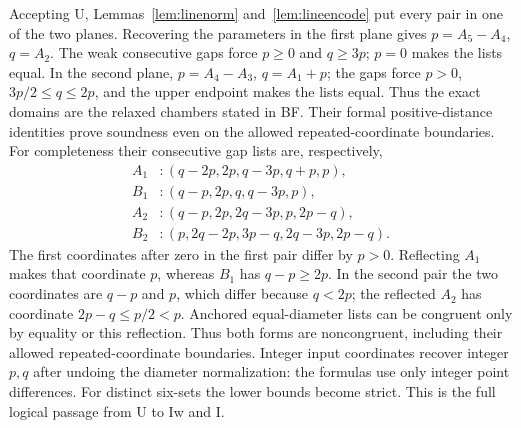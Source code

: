 \documentclass[11pt]{article}
\theoremstyle{remark}
\begin{document}
Accepting U, Lemmas~\ref{lem:linenorm} and~\ref{lem:lineencode} put every
pair in one of the two planes. Recovering the parameters in the first
plane gives $p=A_5-A_4$, $q=A_2$. The weak consecutive gaps force
$p\ge0$ and $q\ge3p$; $p=0$ makes the lists equal. In the second plane,
$p=A_4-A_3$, $q=A_1+p$; the gaps force $p>0$,
$3p/2\le q\le2p$, and the upper endpoint makes the lists equal.
Thus the exact domains are the relaxed chambers stated in BF. Their
formal positive-distance identities prove soundness even on the allowed
repeated-coordinate boundaries. For completeness their consecutive gap
lists are, respectively,
\begin{align*}
 A_1 &: (q-2p,2p,q-3p,q+p,p),\\
 B_1 &: (q-p,2p,q,q-3p,p),\\
 A_2 &: (q-p,2p,2q-3p,p,2p-q),\\
 B_2 &: (p,2q-2p,3p-q,2q-3p,2p-q).
\end{align*}
The first coordinates after zero in the first pair differ by $p>0$.
Reflecting $A_1$ makes that coordinate $p$, whereas $B_1$ has
$q-p\ge2p$. In the second pair the two coordinates are $q-p$ and $p$,
which differ because $q<2p$; the reflected $A_2$ has coordinate
$2p-q\le p/2<p$. Anchored equal-diameter lists can be congruent only by
equality or this reflection. Thus both forms are noncongruent, including
their allowed repeated-coordinate boundaries. Integer input coordinates recover integer
$p,q$ after undoing the diameter normalization: the formulas use only
integer point differences. For distinct six-sets the lower bounds become
strict. This is the full logical passage from U to Iw and I.
\end{document}
